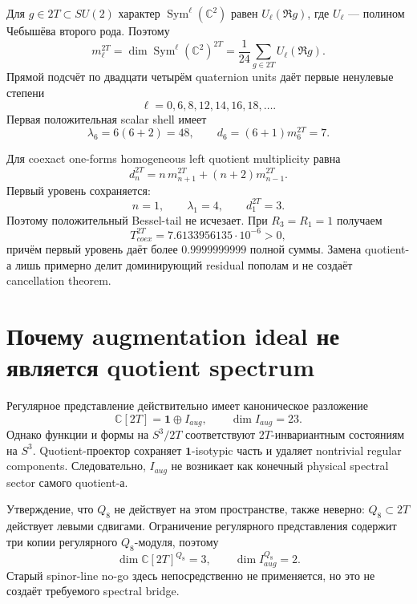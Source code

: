 Для \(g\in2T\subset SU(2)\) характер
\(\operatorname{Sym}^{\ell}(\mathbb C^2)\) равен
\(U_\ell(\Re g)\), где \(U_\ell\) --- полином Чебышёва второго рода.
Поэтому
\begin{equation}
 m_\ell^{2T}
 =\dim\operatorname{Sym}^{\ell}(\mathbb C^2)^{2T}
 =\frac1{24}\sum_{g\in2T}U_\ell(\Re g).
\end{equation}
Прямой подсчёт по двадцати четырём quaternion units даёт первые ненулевые
степени
\begin{equation}
 \ell=0,6,8,12,14,16,18,\ldots.
\end{equation}
Первая положительная scalar shell имеет
\begin{equation}
 \lambda_6=6(6+2)=48,
 \qquad d_6=(6+1)m_6^{2T}=7.
\end{equation}

Для coexact one-forms homogeneous left quotient multiplicity равна
\begin{equation}
 d_n^{2T}
 =n\,m_{n+1}^{2T}+(n+2)m_{n-1}^{2T}.
\end{equation}
Первый уровень сохраняется:
\begin{equation}
 n=1,
 \qquad \lambda_1=4,
 \qquad d_1^{2T}=3.
\end{equation}
Поэтому положительный Bessel-tail не исчезает. При \(R_3=R_1=1\)
получаем
\begin{equation}
 T_{coex}^{2T}=7.6133956135\cdot10^{-6}>0,
\end{equation}
причём первый уровень даёт более
\(0.9999999999\) полной суммы. Замена quotient-а лишь примерно делит
доминирующий residual пополам и не создаёт cancellation theorem.

\section{Почему augmentation ideal не является quotient spectrum}

Регулярное представление действительно имеет каноническое разложение
\begin{equation}
 \mathbb C[2T]=\mathbf1\oplus I_{aug},
 \qquad \dim I_{aug}=23.
\end{equation}
Однако функции и формы на \(S^3/2T\) соответствуют \(2T\)-инвариантным
состояниям на \(S^3\). Quotient-проектор сохраняет \(\mathbf1\)-isotypic
часть и удаляет nontrivial regular components. Следовательно,
\(I_{aug}\) не возникает как конечный physical spectral sector самого
quotient-а.

Утверждение, что \(Q_8\) не действует на этом пространстве, также неверно:
\(Q_8\subset2T\) действует левыми сдвигами. Ограничение регулярного
представления содержит три копии регулярного \(Q_8\)-модуля, поэтому
\begin{equation}
 \dim\mathbb C[2T]^{Q_8}=3,
 \qquad
 \dim I_{aug}^{Q_8}=2.
\end{equation}
Старый spinor-line no-go здесь непосредственно не применяется, но это не
создаёт требуемого spectral bridge.

